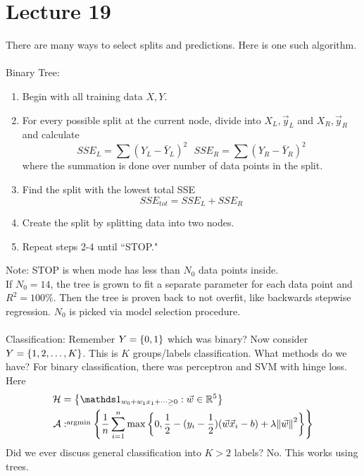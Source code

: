 \documentclass[12pt]{article}
\begin{document}
\section{Lecture 19} 
There are many ways to select splits and predictions. Here is one such algorithm. \\~\\
Binary Tree: \begin{enumerate} 
\item Begin with all training data $X,Y$. 
\item For every possible split at the current node, divide into $X_L, \vec{y}_L$ and $X_R, \vec{y}_R$ and calculate $$SSE_L = \sum (Y_L - \bar{Y}_L)^2 ~~~ SSE_R = \sum (Y_R - \bar{Y}_R)^2 $$ where the summation is done over number of data points in the split. 
\item Find the split with the lowest total SSE 
$$SSE_{tot} = SSE_L + SSE_R $$ 
\item Create the split by splitting data into two nodes. 
\item Repeat steps 2-4 until ``STOP." \end{enumerate} 
Note: STOP is when mode has less than $N_0$ data points inside. \\
If $N_0 = 14$, the tree is grown to fit a separate parameter for each data point and $R^2 = 100\%$. Then the tree is proven back to not overfit, like backwards stepwise regression. $N_0$ is picked via model selection procedure. 
\\~\\
Classification: Remember $Y = \left\{ 0,1 \right\}$ which was binary? Now consider $Y = \left\{ 1,2,\dots,K \right\}$. This is $K$ groups/labels classification. What methods do we have? For binary classification, there was perceptron and SVM with hinge loss. Here $$ \begin{aligned} \mathcal{H} &= \set{\indicator{w_0 + w_1x_1 + \dots \geq 0}: \vec{w} \in \mathbb{R}^5} \\ \mathcal{A}&: \argmin{}\set{\frac{1}{n} \sum_{i=1}^n \max\set{0, \frac{1}{2} - (y_i - \frac{1}{2})(\vec{w}\vec{x}_i - b) + \lambda \norm{\vec{w}}^2}} \end{aligned} $$ 
Did we ever discuss general classification into $K > 2$ labels? No. This works using trees. \\~\\
\end{document}

